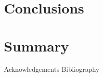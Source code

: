 

\chapter{Conclusions}
\chapter{Summary}

Acknowledgements 
Bibliography







\begin{comment}
Methodology: approach to solving the problem; chosen HCI methodology for the final evaluation - no idea
a. Chosen HCI evaluation methodology
\end{comment}


